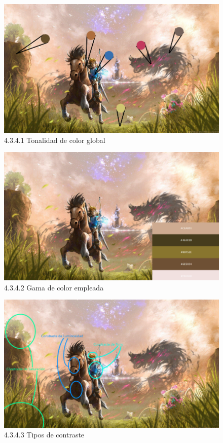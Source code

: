 \documentclass[12pt]{article}
\begin{document}
    \begin{figure}[H]
      \centering
      \includegraphics[scale=0.7]{images/Saúl/Sección 17/EA_img17_4Color_1TonalidadGenral.png}
      \caption{\small 4.3.4.1 Tonalidad de color global}
    \end{figure}



    \begin{figure}[H]
      \centering
      \includegraphics[scale=0.7]{images/Saúl/Sección 17/EA_img17_4Color_2GamaColores.png}
      \caption{\small 4.3.4.2 Gama de color empleada}
    \end{figure}



    \begin{figure}[H]
      \centering
      \includegraphics[scale=0.7]{images/Saúl/Sección 17/EA_img17_4Color_3Contrastes.png}
      \caption{\small 4.3.4.3 Tipos de contraste}
    \end{figure}
\end{document}
